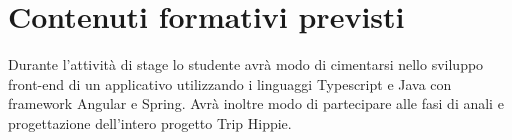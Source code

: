 \section*{Contenuti formativi previsti}
Durante l’attività di stage lo studente avrà modo di cimentarsi nello sviluppo front-end di un applicativo utilizzando i linguaggi Typescript e Java con framework Angular e Spring. Avrà inoltre modo di partecipare alle fasi di anali e progettazione dell'intero progetto Trip Hippie.
\newpage